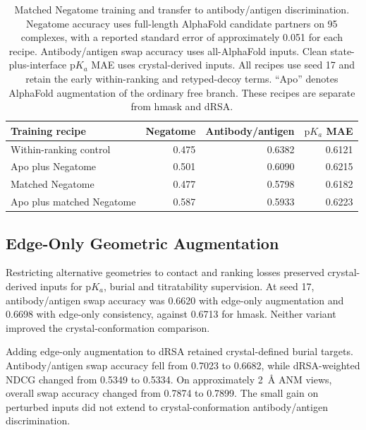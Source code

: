 \begin{table}[htbp]
    \centering
    \small
    \begin{tabular}{lrrr}
        \toprule
        Training recipe & Negatome & Antibody/antigen & $\mathrm{p}K_a$ MAE \\
        \midrule
        Within-ranking control & 0.475 & 0.6382 & 0.6121 \\
        Apo plus Negatome & 0.501 & 0.6090 & 0.6215 \\
        Matched Negatome & 0.477 & 0.5798 & 0.6182 \\
        Apo plus matched Negatome & 0.587 & 0.5933 & 0.6223 \\
        \bottomrule
    \end{tabular}
    \caption[Matched Negatome training and transfer]{Matched Negatome training and transfer to antibody/antigen discrimination. Negatome accuracy uses full-length AlphaFold candidate partners on 95 complexes, with a reported standard error of approximately 0.051 for each recipe. Antibody/antigen swap accuracy uses all-AlphaFold inputs. Clean state-plus-interface $\mathrm{p}K_a$ MAE uses crystal-derived inputs. All recipes use seed 17 and retain the early within-ranking and retyped-decoy terms. ``Apo'' denotes AlphaFold augmentation of the ordinary free branch. These recipes are separate from hmask and dRSA.}
    \label{tab:jaxka-negatome-comparisons}
\end{table}

\subsection{Edge-Only Geometric Augmentation}
\label{app:jaxka-geometry-comparisons}

Restricting alternative geometries to contact and ranking losses preserved crystal-derived inputs for $\mathrm{p}K_a$, burial and titratability supervision. At seed 17, antibody/antigen swap accuracy was 0.6620 with edge-only augmentation and 0.6698 with edge-only consistency, against 0.6713 for hmask. Neither variant improved the crystal-conformation comparison.

Adding edge-only augmentation to dRSA retained crystal-defined burial targets. Antibody/\allowbreak antigen swap accuracy fell from 0.7023 to 0.6682, while dRSA-weighted NDCG changed from 0.5349 to 0.5334. On approximately 2~\AA{} ANM views, overall swap accuracy changed from 0.7874 to 0.7899. The small gain on perturbed inputs did not extend to crystal-conformation antibody/antigen discrimination.

